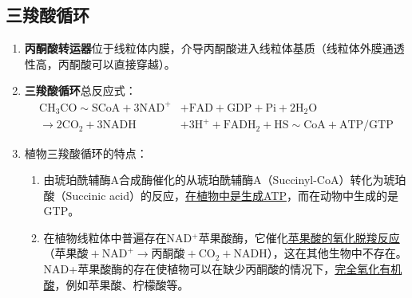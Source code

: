 \subsection{三羧酸循环}
\begin{enumerate}
    \item \textbf{丙酮酸转运器}位于线粒体内膜，介导丙酮酸进入线粒体基质（线粒体外膜通透性高，丙酮酸可以直接穿越）。
    \item \textbf{三羧酸循环}总反应式：
    \[\begin{aligned}
        \text{CH}_3\text{CO}\sim\text{SCoA}+3\text{NAD}^+&+\text{FAD}+\text{GDP}+\text{Pi}+2\text{H}_2\text{O}\\\to 2\text{CO}_2+3\text{NADH}&+3\text{H}^++\text{FADH}_2+\text{HS}\sim\text{CoA}+\text{ATP/GTP}
    \end{aligned}\]
    \item 植物三羧酸循环的特点：
    \begin{enumerate}
        \item 由琥珀酰辅酶A合成酶催化的从琥珀酰辅酶A（Succinyl-CoA）转化为琥珀酸（Succinic acid）的反应，\uline{在植物中是生成ATP}，而在动物中生成的是GTP。
        \item 在植物线粒体中普遍存在NAD$^+$苹果酸酶，它催化\uline{苹果酸的氧化脱羧反应}（$\text{苹果酸}+\text{NAD}^+\to\text{丙酮酸}+\text{CO}_2+\text{NADH}$），这在其他生物中不存在。NAD+苹果酸酶的存在使植物可以在缺少丙酮酸的情况下，\uline{完全氧化有机酸}，例如苹果酸、柠檬酸等。
    \end{enumerate}
\end{enumerate}
